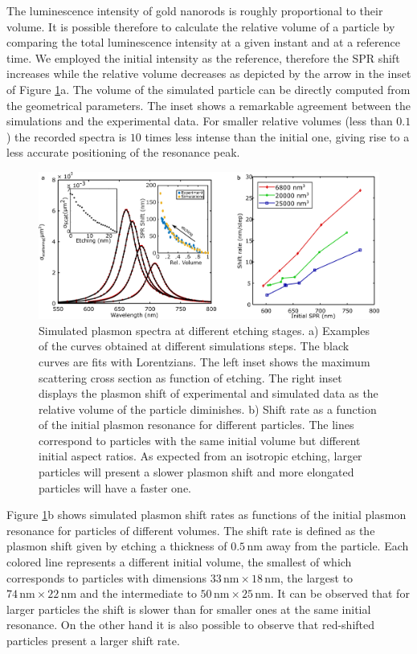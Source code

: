 \documentclass[twoside,twocolumn,11pt]{article}
\newcommand{\nm}{\ensuremath{\,\textrm{nm}}}
\begin{document}
The luminescence intensity of gold nanorods is roughly proportional to their volume. It
is possible therefore to calculate the relative volume of a particle by
comparing the total luminescence intensity at a given instant and at a reference
time. We employed the initial intensity as the reference, therefore the
SPR shift increases while the relative volume decreases as depicted by the arrow
in the inset of Figure \ref{fig:simulations}a. The volume of the simulated
particle can be directly computed from the geometrical parameters. The inset
shows a remarkable agreement between the simulations and the experimental data.
For smaller relative volumes (less than $0.1$) the recorded spectra is $10$
times less intense than the initial one, giving rise to a less accurate
positioning of the resonance peak.

\begin{figure}[htp]
 \centering
 \includegraphics[width=\textwidth]{Figures/02_Simulations/simulations.png}
 \caption{Simulated plasmon spectra at different etching stages. a) Examples of
 the curves obtained at different simulations steps. The black curves are fits
 with Lorentzians. The left inset shows the maximum scattering cross section as
 function of etching. The right inset displays the plasmon shift of
 experimental and simulated data as the relative volume of the particle
 diminishes. b) Shift rate as a function of the initial plasmon resonance for
 different particles. The lines correspond to particles with the same initial
 volume but different initial aspect ratios. As expected from an isotropic
 etching, larger particles will present a slower plasmon shift and more
 elongated particles will have a faster one.}
 \label{fig:simulations}
\end{figure}

Figure \ref{fig:simulations}b shows simulated plasmon shift rates as functions
of the initial plasmon resonance for particles of different volumes. The shift
rate is defined as the plasmon shift given by etching a thickness of $0.5\nm$
away from the particle. Each colored line represents a different initial volume,
the smallest of which corresponds to particles with dimensions
$33\nm\times18\nm$, the largest to $74\nm\times22\nm$ and the intermediate to
$50\nm\times25\nm$. It can be observed that for larger particles the shift is
slower than for smaller ones at the same initial resonance. On the other hand it
is also possible to observe that red-shifted particles present a larger shift
rate.
\end{document}
